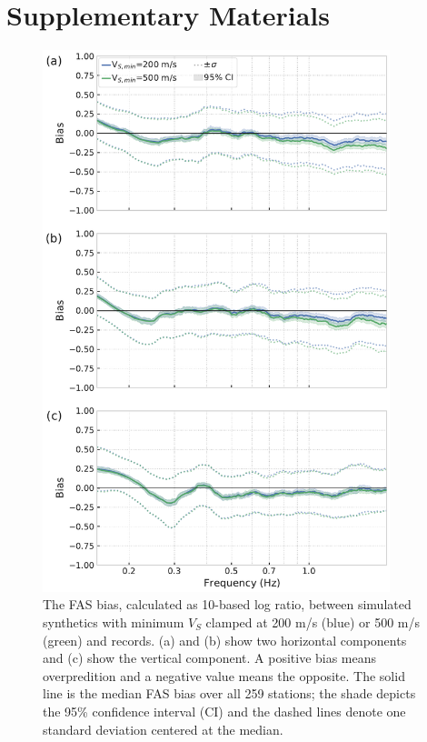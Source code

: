 \setcounter{table}{0}
\setcounter{figure}{0}
\renewcommand{\thetable}{S\arabic{chapter}.\arabic{table}}
\renewcommand{\thefigure}{S\arabic{chapter}.\arabic{figure}}
\newpage
\section*{Supplementary Materials}

\begin{figure}[!ht]
  \centering
  \includegraphics[width=0.9\textwidth,height=0.85\textheight,keepaspectratio]{figures/figure_highf_S1.pdf}
  \caption{
  The FAS bias, calculated as 10-based log ratio, between simulated synthetics with minimum $V_S$ clamped at 200 m/s (blue) or 500 m/s (green) and records. (a) and (b) show two horizontal components and (c) show the vertical component. A positive bias means overpredition and a negative value means the opposite. The solid line is the median FAS bias over all 259 stations; the shade depicts the 95\% confidence interval (CI) and the dashed lines denote one standard deviation centered at the median.
  }
  \label{fig:highf-S1}
\end{figure}
\clearpage

